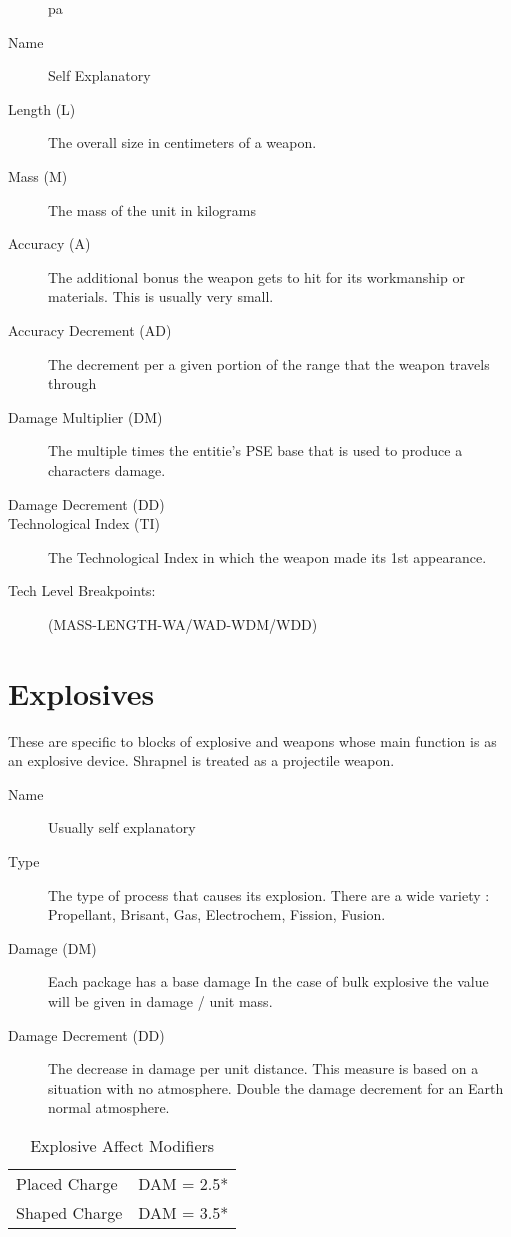 \begin{description}pa
	\item[Name]
	Self Explanatory
	\item[Length (L)]
	The overall size in centimeters of a weapon.
	\item[Mass (M)]
	The mass of the unit in kilograms
	\item[Accuracy (A)]
	The additional bonus the weapon gets to hit for its workmanship or
	materials. This is usually very small.
	\item[Accuracy Decrement (AD)]
	The decrement per a given portion of the range that the weapon travels through
	\item[Damage Multiplier (DM)]
	The multiple times the entitie's PSE base that is used to produce a characters
	damage.
	\item[Damage Decrement (DD)]
	\item[Technological Index (TI)]
	The Technological Index in which the weapon made its 1st appearance.
	\item[Tech Level Breakpoints:]
	(MASS-LENGTH-WA/WAD-WDM/WDD)
\end{description}

\clearpage
\section{Explosives}

These are specific to blocks of explosive and weapons whose main 
function is as an explosive device. Shrapnel is treated as a
projectile weapon.

\begin{description}
	\item[Name]
	Usually self explanatory
	\item[Type ]
	The type of process that causes its explosion. There are a wide 
	variety : Propellant, Brisant, Gas, Electrochem, Fission, Fusion.
	\item[Damage (DM)]
	Each package has a base damage In the case of bulk explosive the value
	will be given in damage / unit mass. 
	\item[Damage Decrement (DD)]
	The decrease in damage per unit distance. This measure is based on 
	a situation with no atmosphere. Double the damage decrement for an 
	Earth normal atmosphere. 
\end{description}

\begin{table}[h]
\centering
\caption{Explosive Affect Modifiers}
	\begin{tabular}{ll} \hline
		Placed Charge  & DAM = 2.5* \\
		Shaped Charge  & DAM = 3.5* \\ \hline
	\end{tabular}
\end{table}



